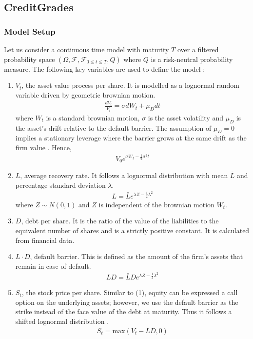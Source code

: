 \documentclass[11t,a4paper]{article}
\begin{document}
\subsection{CreditGrades}
\subsubsection{Model Setup}
Let us consider a continuous time model with maturity $T$ over a filtered probability space $(\Omega, \mathcal{F}, \mathcal{F}_{0\leq{t}\leq{T}}, Q)$ where $Q$ is a risk-neutral probability measure. The following key variables are used to define the model \cite{cg}:
\begin{enumerate}
\item $V_t$, the asset value process per share. It is modelled as a lognormal random variable driven by geometric brownian motion. 
\begin{align} \frac{dV_t}{V_t} = \sigma dW_t + \mu_Ddt\end{align}
where $W_t$ is a standard brownian motion, $\sigma$ is the asset volatility and $\mu_D$ is the asset's drift relative to the default barrier. The assumption of $\mu_D=0$ implies a stationary leverage where the barrier grows at the same drift as the firm value \cite{sfin}. Hence, 
\begin{align} V_0e^{\sigma W_t-\frac{1}{2}\sigma^2t} \end{align}
\item $L$, average recovery rate. It follows a lognormal distribution with mean $\bar{L}$ and percentage standard deviation $\lambda$.
\begin{align} L  = \bar{L}e^{\lambda Z - \frac{1}{2}\lambda^2} \end{align}
where $Z \sim N(0,1)$ and $Z$ is independent of the brownian motion $W_t$. 
\item $D$, debt per share. It is the ratio of the value of the liabilities to the equivalent number of shares and is a strictly positive constant. It is calculated from financial data. 
\item $L\cdot D$, default barrier. This is defined as the amount of the firm's assets that remain in case of default. 
\begin{align} L D = \bar{L}De^{\lambda Z - \frac{1}{2}\lambda^2} \end{align}
\item $S_t$, the stock price per share. Similar to (1), equity can be expressed a call option on the underlying assets; however, we use the default barrier as the strike instead of the face value of the debt at maturity. Thus it follows a shifted lognormal distribution \cite{sfin}. 
\begin{align}
    S_t = \text{max}(V_t - LD, 0)
\end{align}
\end{enumerate}
\end{document}
